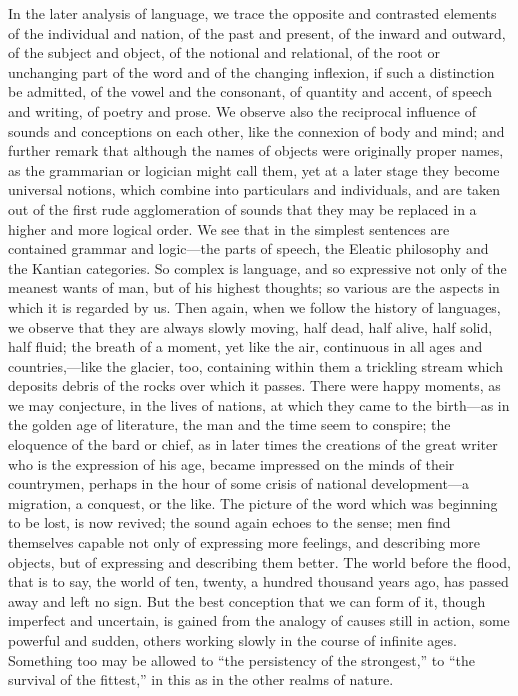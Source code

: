 \documentclass[11pt,letter]{article}
\begin{document}
\par  In the later analysis of language, we trace the opposite and contrasted elements of the individual and nation, of the past and present, of the inward and outward, of the subject and object, of the notional and relational, of the root or unchanging part of the word and of the changing inflexion, if such a distinction be admitted, of the vowel and the consonant, of quantity and accent, of speech and writing, of poetry and prose. We observe also the reciprocal influence of sounds and conceptions on each other, like the connexion of body and mind; and further remark that although the names of objects were originally proper names, as the grammarian or logician might call them, yet at a later stage they become universal notions, which combine into particulars and individuals, and are taken out of the first rude agglomeration of sounds that they may be replaced in a higher and more logical order. We see that in the simplest sentences are contained grammar and logic—the parts of speech, the Eleatic philosophy and the Kantian categories. So complex is language, and so expressive not only of the meanest wants of man, but of his highest thoughts; so various are the aspects in which it is regarded by us. Then again, when we follow the history of languages, we observe that they are always slowly moving, half dead, half alive, half solid, half fluid; the breath of a moment, yet like the air, continuous in all ages and countries,—like the glacier, too, containing within them a trickling stream which deposits debris of the rocks over which it passes. There were happy moments, as we may conjecture, in the lives of nations, at which they came to the birth—as in the golden age of literature, the man and the time seem to conspire; the eloquence of the bard or chief, as in later times the creations of the great writer who is the expression of his age, became impressed on the minds of their countrymen, perhaps in the hour of some crisis of national development—a migration, a conquest, or the like. The picture of the word which was beginning to be lost, is now revived; the sound again echoes to the sense; men find themselves capable not only of expressing more feelings, and describing more objects, but of expressing and describing them better. The world before the flood, that is to say, the world of ten, twenty, a hundred thousand years ago, has passed away and left no sign. But the best conception that we can form of it, though imperfect and uncertain, is gained from the analogy of causes still in action, some powerful and sudden, others working slowly in the course of infinite ages. Something too may be allowed to “the persistency of the strongest,” to “the survival of the fittest,” in this as in the other realms of nature.
\end{document}
